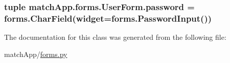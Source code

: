 \subsubsection[{password}]{\setlength{\rightskip}{0pt plus 5cm}tuple match\+App.\+forms.\+User\+Form.\+password = forms.\+Char\+Field(widget=forms.\+Password\+Input())\hspace{0.3cm}{\ttfamily [static]}}\label{classmatch_app_1_1forms_1_1_user_form_a22fba20516b0361b6db1a96fc08c5053}


The documentation for this class was generated from the following file\+:\begin{DoxyCompactItemize}
\item 
match\+App/\hyperlink{forms_8py}{forms.\+py}\end{DoxyCompactItemize}
